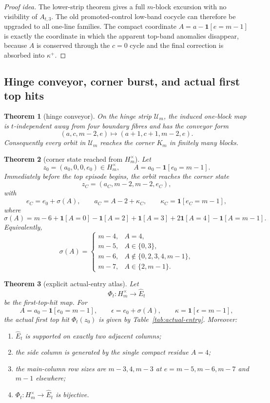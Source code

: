 \documentclass[11pt]{article}
\newtheorem{theorem}{Theorem}[section]
\newcommand{\1}{\mathbf 1}
\newcommand{\Hmx}{H_m^\times}
\newcommand{\Um}{\mathcal U_m}
\newcommand{\Em}{\widehat E_t}
\begin{document}
\begin{proof}[Proof idea]
The lower-strip theorem gives a full \(m\)-block excursion with no visibility of \(A_{t,3}\).
The old promoted-control low-band cocycle can therefore be upgraded to all one-line families.
The compact coordinate \(A=a-\1[e=m-1]\) is exactly the coordinate in which the apparent top-band anomalies disappear, because \(A\) is conserved through the \(c=0\) cycle and the final correction is absorbed into \(\kappa^+\).
\end{proof}

\subsection{Hinge conveyor, corner burst, and actual first top hits}

\begin{theorem}[hinge conveyor]
On the hinge strip \(\Um\), the induced one-block map is \(t\)-independent away from four boundary fibres and has the conveyor form
\[
(a,c,m-2,e)\mapsto (a+1,c+1,m-2,e).
\]
Consequently every orbit in \(\Um\) reaches the corner \(K_m\) in finitely many blocks.
\end{theorem}

\begin{theorem}[corner state reached from \(\Hmx\)]
Let
\[
z_0=(a_0,0,0,e_0)\in \Hmx,\qquad
A=a_0-\1[e_0=m-1].
\]
Immediately before the top episode begins, the orbit reaches the corner state
\[
z_C=(a_C,m-2,m-2,e_C),
\]
with
\[
e_C=e_0+\sigma(A),\qquad
a_C=A-2+\kappa_C,\qquad
\kappa_C=\1[e_C=m-1],
\]
where
\[
\sigma(A)
=
m-6+\1[A=0]-\1[A=2]+\1[A=3]+2\1[A=4]-\1[A=m-1].
\]
Equivalently,
\[
\sigma(A)=
\begin{cases}
m-4,& A=4,\\
m-5,& A\in\{0,3\},\\
m-6,& A\notin\{0,2,3,4,m-1\},\\
m-7,& A\in\{2,m-1\}.
\end{cases}
\]
\end{theorem}

\begin{theorem}[explicit actual-entry atlas]
Let
\[
\Phi_t:\Hmx\to \Em
\]
be the first-top-hit map.
For
\[
A=a_0-\1[e_0=m-1],\qquad
\epsilon=e_0+\sigma(A),\qquad
\kappa=\1[\epsilon=m-1],
\]
the actual first top hit \(\Phi_t(z_0)\) is given by Table~\ref{tab:actual-entry}.
Moreover:
\begin{enumerate}[label=\textup{(\arabic*)},leftmargin=2.8em]
\item \(\Em\) is supported on exactly two adjacent columns;
\item the side column is generated by the single compact residue \(A=4\);
\item the main-column row sizes are \(m-3,4,m-3\) at \(e=m-5,m-6,m-7\) and \(m-1\) elsewhere;
\item \(\Phi_t:\Hmx\to \Em\) is bijective.
\end{enumerate}
\end{theorem}
\end{document}
